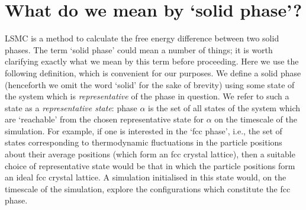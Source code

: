 \documentclass{report}
\begin{document}
\section{What do we mean by `solid phase'?}\label{sec:phase}
LSMC is a method to calculate the free energy difference between two solid phases. The term `solid phase' could mean a number of things;
it is worth clarifying exactly what we mean by this term before proceeding. Here we use the following definition, which is convenient for our 
purposes. We define a solid phase (henceforth we omit the word `solid' for the sake of brevity)
using some state of the system which is \emph{representative} of the phase in question. We refer to such a state 
as a \emph{representative state}: phase $\alpha$ is the set of all states of the system which are `reachable' from the chosen representative 
state for $\alpha$ on the timescale of the simulation. 
For example, if one is interested in the `fcc phase', i.e., the set of states corresponding to thermodynamic fluctuations in the particle 
positions about their average positions (which form an fcc crystal lattice), then a suitable choice of representative state would be that 
in which the particle positions form an ideal fcc crystal lattice. A simulation initialised in this state would, on the timescale of the 
simulation, explore the configurations which constitute the fcc phase.
\end{document}
